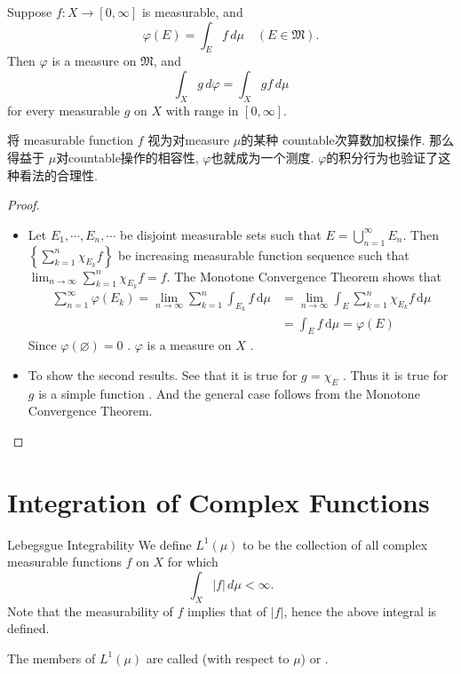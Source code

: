 \documentclass[../main.tex]{subfiles}
\begin{document}
\begin{theorem}{}{}
Suppose $f: X \to [0, \infty]$ is measurable, and
\[
\varphi(E) = \int_E f \, d\mu \quad (E \in \mathfrak{M}).
\]
Then $\varphi$ is a measure on $\mathfrak{M}$, and
\[
\int_X g \, d\varphi = \int_X gf \, d\mu
\]
for every measurable $g$ on $X$ with range in $[0, \infty]$.
\end{theorem}
\begin{note}
    将 measurable function \(  f  \) 视为对measure \(  \mu   \)的某种 countable次算数加权操作.   那么得益于 \(  \mu   \)对countable操作的相容性,  \(   \varphi   \)也就成为一个测度.  \(   \varphi   \)的积分行为也验证了这种看法的合理性.    
\end{note}
\begin{proof}
    \begin{itemize}
        \item Let \(  E_1,\cdots ,E_{n},\cdots    \) be disjoint measurable sets such that \(  E= \bigcup _{n = 1}^{\infty}E_{n}  \).  Then \(  \left\{ \sum _{k= 1}^{n}\chi _{E_{k}}f \right\}  \) be increasing measurable function sequence such that  \(  \lim_{n\to \infty} \sum _{k= 1}^{n}\chi _{E_{k}}f= f  \).     The Monotone Convergence Theorem shows that \[
   \begin{aligned}
    \sum _{n = 1}^{\infty} \varphi \left( E_{k} \right)= \lim_{n\to \infty} \sum _{ k= 1}^{n} \int_{E_{k}}f\,\mathrm{d} \mu &=   \lim_{n\to \infty} \int_{E} \sum _{k = 1}^{n}\chi _{E_{k}}f\,\mathrm{d} \mu  \\ 
     &=  \int_{E}f\,\mathrm{d} \mu =  \varphi \left( E \right) 
   \end{aligned}
    \]Since \(   \varphi \left( \varnothing \right) = 0   \) .  \(   \varphi   \) is a measure on \(  X  \) . 
    
    \item To show the second results. See that it is true for \(  g = \chi _{E}  \) . Thus it is true for \(  g  \) is a simple function .   And the general case follows from the Monotone Convergence Theorem. 
    \end{itemize}
    
\end{proof}


\section{Integration of Complex Functions }

\begin{definition}{Lebegsgue Integrability}{}
We define $L^1(\mu)$ to be the collection of all complex measurable functions $f$ on $X$ for which
\[
\int_X |f| \, d\mu < \infty.
\]
Note that the measurability of $f$ implies that of $|f|$, hence the above integral is defined.

The members of $L^1(\mu)$ are called  (with respect to $\mu$) or . 
\end{definition}
\end{document}
